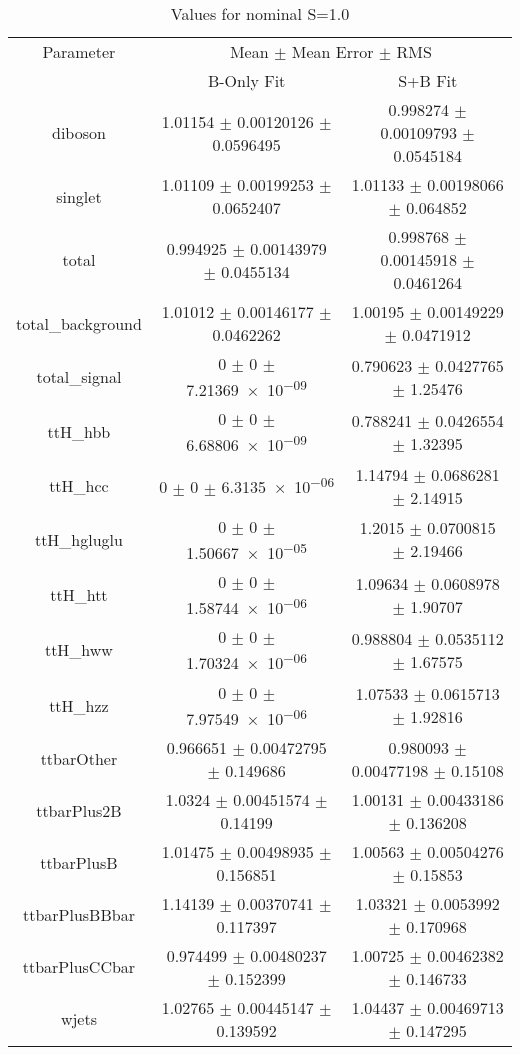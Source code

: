 \begin{table}
\centering
\caption{Values for nominal S=1.0}
\begin{tabular}{ccc}
\toprule
Parameter & \multicolumn{2}{c}{Mean $\pm$ Mean Error $\pm$ RMS}\\
 & B-Only Fit & S+B Fit\\
\midrule
diboson & \num{1.01154} $\pm$ \num{0.00120126} $\pm$ \num{0.0596495} & \num{0.998274} $\pm$ \num{0.00109793} $\pm$ \num{0.0545184}\\
singlet & \num{1.01109} $\pm$ \num{0.00199253} $\pm$ \num{0.0652407} & \num{1.01133} $\pm$ \num{0.00198066} $\pm$ \num{0.064852}\\
total & \num{0.994925} $\pm$ \num{0.00143979} $\pm$ \num{0.0455134} & \num{0.998768} $\pm$ \num{0.00145918} $\pm$ \num{0.0461264}\\
total\_background & \num{1.01012} $\pm$ \num{0.00146177} $\pm$ \num{0.0462262} & \num{1.00195} $\pm$ \num{0.00149229} $\pm$ \num{0.0471912}\\
total\_signal & \num{0} $\pm$ \num{0} $\pm$ \num{7.21369e-09} & \num{0.790623} $\pm$ \num{0.0427765} $\pm$ \num{1.25476}\\
ttH\_hbb & \num{0} $\pm$ \num{0} $\pm$ \num{6.68806e-09} & \num{0.788241} $\pm$ \num{0.0426554} $\pm$ \num{1.32395}\\
ttH\_hcc & \num{0} $\pm$ \num{0} $\pm$ \num{6.3135e-06} & \num{1.14794} $\pm$ \num{0.0686281} $\pm$ \num{2.14915}\\
ttH\_hgluglu & \num{0} $\pm$ \num{0} $\pm$ \num{1.50667e-05} & \num{1.2015} $\pm$ \num{0.0700815} $\pm$ \num{2.19466}\\
ttH\_htt & \num{0} $\pm$ \num{0} $\pm$ \num{1.58744e-06} & \num{1.09634} $\pm$ \num{0.0608978} $\pm$ \num{1.90707}\\
ttH\_hww & \num{0} $\pm$ \num{0} $\pm$ \num{1.70324e-06} & \num{0.988804} $\pm$ \num{0.0535112} $\pm$ \num{1.67575}\\
ttH\_hzz & \num{0} $\pm$ \num{0} $\pm$ \num{7.97549e-06} & \num{1.07533} $\pm$ \num{0.0615713} $\pm$ \num{1.92816}\\
ttbarOther & \num{0.966651} $\pm$ \num{0.00472795} $\pm$ \num{0.149686} & \num{0.980093} $\pm$ \num{0.00477198} $\pm$ \num{0.15108}\\
ttbarPlus2B & \num{1.0324} $\pm$ \num{0.00451574} $\pm$ \num{0.14199} & \num{1.00131} $\pm$ \num{0.00433186} $\pm$ \num{0.136208}\\
ttbarPlusB & \num{1.01475} $\pm$ \num{0.00498935} $\pm$ \num{0.156851} & \num{1.00563} $\pm$ \num{0.00504276} $\pm$ \num{0.15853}\\
ttbarPlusBBbar & \num{1.14139} $\pm$ \num{0.00370741} $\pm$ \num{0.117397} & \num{1.03321} $\pm$ \num{0.0053992} $\pm$ \num{0.170968}\\
ttbarPlusCCbar & \num{0.974499} $\pm$ \num{0.00480237} $\pm$ \num{0.152399} & \num{1.00725} $\pm$ \num{0.00462382} $\pm$ \num{0.146733}\\
wjets & \num{1.02765} $\pm$ \num{0.00445147} $\pm$ \num{0.139592} & \num{1.04437} $\pm$ \num{0.00469713} $\pm$ \num{0.147295}\\
\bottomrule
\end{tabular}
\end{table}